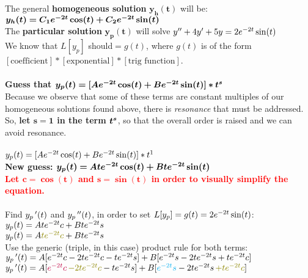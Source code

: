 \documentclass{article}
\begin{document}
\begin{enumerate}
The general \textbf{homogeneous solution} $\bm{y_h(t)}$ will be:\\
$\bm{y_h(t) = C_1e\sp{-2t}\cos(t) + C_2e\sp{-2t}\sin(t)}$\\

The \textbf{particular solution} $\bm{y_p(t)}$ will solve $y\sp{\prime\prime}+4y\sp{\prime}+5y=2e\sp{-2t}\sin(t)$\\
We know that $L[y_p]$ should$= g(t)$, where $g(t)$ is of the form $[\text{coefficient}]*[\text{exponential}]*[\text{trig function}]$.\\\\
\textbf{Guess that $\bm{y_p(t) = [Ae\sp{-2t}\cos(t) + Be\sp{-2t}\sin(t)]*t\sp{s}}$}\\
Because we observe that some of these terms are constant multiples of our homogeneous solutions found above, there is \emph{resonance} that must be addressed. So, \textbf{let $\bm{s=1}$ in the term $\bm{t\sp{s}}$}, so that the overall order is raised and we can avoid resonance.\\\\
$y_p(t) = [Ae\sp{-2t}\cos(t) + Be\sp{-2t}\sin(t)]*t\sp{1}$\\
\textbf{New guess: $\bm{y_p(t) = Ate\sp{-2t}\cos(t) + Bte\sp{-2t}\sin(t)}$}\\
\textcolor{red}{\textbf{Let $\bm{c = \cos(t)}$ and $\bm{s = \sin(t)}$ in order to visually simplify the equation.}}\\\\
Find $y_p\,\sp{\prime}(t)$ and $y_p\,\sp{\prime\prime}(t)$, in order to set $L[y_p] = g(t) = 2e\sp{-2t}\sin(t)$:\\
$y_p(t) = Ate\sp{-2t}c + Bte\sp{-2t}s$\\
$y_p(t) = A\textcolor{olive}{te\sp{-2t}c} + Bte\sp{-2t}s$\\
Use the generic (triple, in this case) product rule for both terms:\\
$y_p\,\sp{\prime}(t) = A[e\sp{-2t}c -2te\sp{-2t}c - te\sp{-2t}s] + B[e\sp{-2t}s - 2te\sp{-2t}s + te\sp{-2t}c]$\\
$y_p\,\sp{\prime}(t) = A[\textcolor{purple}{e\sp{-2t}c} \,\textcolor{olive}{-2te\sp{-2t}c} - te\sp{-2t}s] + B[\textcolor{cyan}{e\sp{-2t}s} - 2te\sp{-2t}s\, \textcolor{olive}{+te\sp{-2t}c}]$\\


\end{enumerate}
\end{document}
